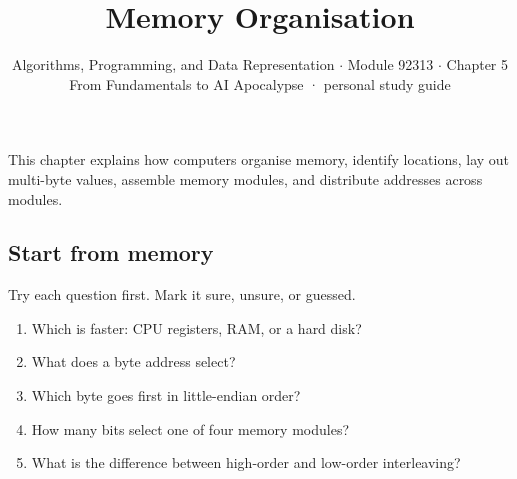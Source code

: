 \documentclass[11pt]{article}
\title{\sffamily\bfseries\color{FAUblue}Memory Organisation}
\author{Algorithms, Programming, and Data Representation \ensuremath{\cdot} Module 92313 \ensuremath{\cdot} Chapter 5\\[2pt]\small From Fundamentals to AI Apocalypse · personal study guide}
\date{}
\begin{document}
\maketitle
\begingroup\footnotesize\setlength{\parskip}{0pt}\tableofcontents\endgroup
\clearpage

{\large This chapter explains how computers organise memory, identify locations, lay out multi-byte values, assemble memory modules, and distribute addresses across modules.}


\begin{keepsection}
\section{Start from memory}

Try each question first. Mark it sure, unsure, or guessed.

\begin{enumerate}
\item Which is faster: CPU registers, RAM, or a hard disk?
\item What does a byte address select?
\item Which byte goes first in little-endian order?
\item How many bits select one of four memory modules?
\item What is the difference between high-order and low-order interleaving?
\end{enumerate}

\end{keepsection}
\end{document}
